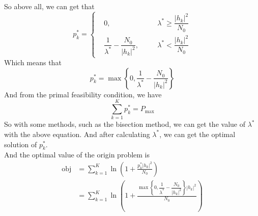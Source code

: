 So above all, we can get that
$$p_k^* = \left\{
\begin{aligned}
&0, &&\quad \lambda^* \geq \dfrac{\left|h_k\right|^2}{N_0} \\
&\dfrac{1}{\lambda^*} - \dfrac{N_0}{\left|h_k\right|^2}, &&\quad \lambda^* < \dfrac{\left|h_k\right|^2}{N_0}
\end{aligned}
\right.$$
Which means that
$$p_k^* = \max\left\{0, \dfrac{1}{\lambda^*} - \dfrac{N_0}{\left|h_k\right|^2}\right\}$$
And from the primal feasibility condition, we have
$$\sum_{k=1}^K p_k^* = P_{\max}$$
So with some methods, such as the bisection method, we can get the value of $\lambda^*$ with the above equation. And after calculating $\lambda^*$, we can get the optimal solution of $p_k^*$. \\
And the optimal value of the origin problem is
\begin{align*}
\text{obj} &= \sum_{k=1}^K \ln \left(1+\frac{p_k^*\left|h_k\right|^2}{N_0}\right) \\
&= \sum_{k=1}^K \ln \left(1+\frac{\max\left\{0, \dfrac{1}{\lambda^*} - \dfrac{N_0}{\left|h_k\right|^2}\right\}\left|h_k\right|^2}{N_0}\right)
\end{align*}